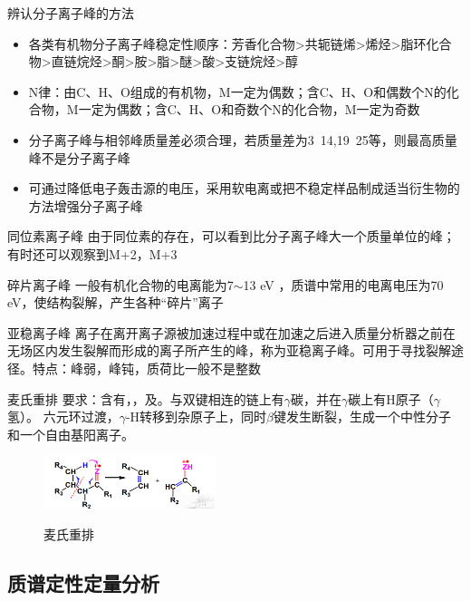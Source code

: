 \begin{note}
    辨认分子离子峰的方法
    \begin{itemize}
        \item 各类有机物分子离子峰稳定性顺序：芳香化合物>共轭链烯>烯烃>脂环化合物>直链烷烃>酮>胺>脂>醚>酸>支链烷烃>醇
        \item N律：由C、H、O组成的有机物，M一定为偶数；含C、H、O和偶数个N的化合物，M一定为偶数；含C、H、O和奇数个N的化合物，M一定为奇数
        \item 分子离子峰与相邻峰质量差必须合理，若质量差为3~14,19~25等，则最高质量峰不是分子离子峰
        \item 可通过降低电子轰击源的电压，采用软电离或把不稳定样品制成适当衍生物的方法增强分子离子峰
    \end{itemize}
\end{note}
 \begin{definition*}{同位素离子峰}
    由于同位素的存在，可以看到比分子离子峰大一个质量单位的峰；有时还可以观察到M+2，M+3
 \end{definition*}
 \begin{definition*}{ 碎片离子峰}
   一般有机化合物的电离能为7$\sim$13 eV ，质谱中常用的电离电压为70 eV，使结构裂解，产生各种“碎片”离子
 \end{definition*}
 \begin{definition*}{亚稳离子峰}
    离子在离开离子源被加速过程中或在加速之后进入质量分析器之前在无场区内发生裂解而形成的离子所产生的峰，称为亚稳离子峰。可用于寻找裂解途径。特点：峰弱，峰钝，质荷比一般不是整数
 \end{definition*}
\begin{theorem*}{麦氏重排}
    要求：含有，，及。与双键相连的链上有$\gamma$碳，并在$\gamma$碳上有H原子（$\gamma$氢）。
六元环过渡，$\gamma$-H转移到杂原子上，同时$\beta$键发生断裂，生成一个中性分子和一个自由基阳离子。

\end{theorem*}
\begin{figure}[ht]
    \centering
    \includegraphics[width=5cm]{image/chp2_m_reform.png}
    \label{fig:chp2_reform}
    \caption[]{麦氏重排}
\end{figure}



\subsection{质谱定性定量分析}

